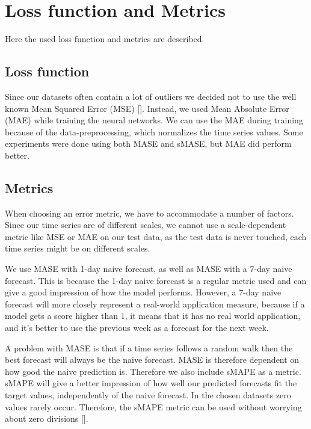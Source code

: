 
\section{Loss function and Metrics}
\label{section:Method:Metrics}

Here the used loss function and metrics are described.

\subsection*{Loss function}
Since our datasets often contain a lot of outliers we decided not to use the well known
Mean Squared Error (MSE) [].
Instead, we used Mean Absolute Error (MAE) while training the neural networks.
We can use the MAE during training because of the data-preprocessing,
which normalizes the time series values.
Some experiments were done using both MASE and sMASE, but MAE did perform better.

\subsection*{Metrics}
When choosing an error metric, we have to accommodate a number of factors.
Since our time series are of different scales, we cannot use a scale-dependent metric
like MSE or MAE on our test data, as the test data is never touched, each time series might be on different scales.

We use MASE with 1-day naive forecast, as well as MASE with a 7-day
naive forecast. This is because the 1-day naive forecast is a regular metric used
and can give a good impression of how the model performs.
However, a 7-day naive forecast will more closely represent a real-world application measure,
because if a model gets a score higher than $1$, it means that it has no real world application,
and it's better to use the previous week as a forecast for the next week.

A problem with MASE is that if a time series follows a random walk
then the best forecast will always be the naive forecast. MASE is therefore dependent on
how good the naive prediction is.
Therefore we also include sMAPE as a metric.
sMAPE will give a better impression of how well our predicted forecasts fit the target values,
independently of the naive forecast.
In the chosen datasets zero values rarely occur.
Therefore, the sMAPE metric can be used without worrying about zero divisions [].

